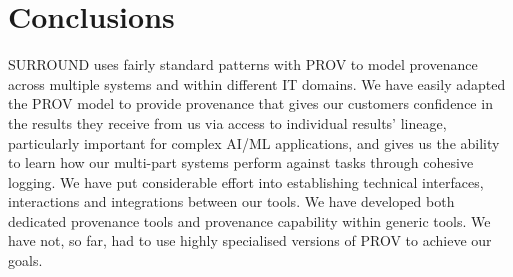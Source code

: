 \documentclass[letterpaper,twocolumn,10pt]{article}
\begin{document}
\section{Conclusions}
SURROUND uses fairly standard patterns with PROV to model provenance across multiple systems and within different IT domains.
We have easily adapted the PROV model to provide provenance that gives our customers confidence in the results
they receive from us via access to individual results' lineage, particularly important for complex AI/ML applications, and gives us the 
ability to learn how our multi-part systems perform against tasks through cohesive logging. We have put considerable effort into establishing
technical interfaces, interactions and integrations between our tools. We have developed both dedicated provenance tools and provenance
capability within generic tools. We have not, so far, had to use highly specialised versions of PROV to achieve our goals.


% 


\end{document}
